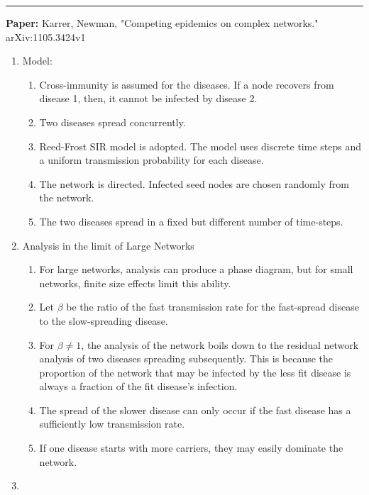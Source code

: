 \documentclass[11pt]{article}
\begin{document}
\noindent
\rule{\textwidth}{0.01in}
\textbf{Paper: } Karrer, Newman, "Competing epidemics on complex networks." arXiv:1105.3424v1
\begin{enumerate}
    
    \item Model: \begin{enumerate}
        \item Cross-immunity is assumed for the diseases. If a node 
        recovers from disease 1, then, it cannot be infected by disease 2.
        
        \item Two diseases spread concurrently.
        
        \item Reed-Frost SIR model is adopted. The model uses discrete time steps and a uniform transmission probability for each disease.
        
        \item The network is directed. Infected seed nodes
        are chosen randomly from the network. 
        
        \item The two diseases spread in a fixed but different
        number of time-steps.
    \end{enumerate}
    
    \item Analysis in the limit of Large Networks
    \begin{enumerate}
        
        \item For large networks, analysis can produce a phase diagram, but for small networks, finite size effects limit this ability.
        
        \item Let $\beta$ be the ratio of the fast transmission rate for the fast-spread disease to the slow-spreading disease.
        
        \item For $\beta \neq 1$, the analysis of the network boils down to the residual network analysis of two diseases spreading subsequently. This is because the proportion of the network that may be infected by the less fit disease is always a fraction of the fit disease's infection.
        
        \item The spread of the slower disease can only occur if the fast disease has a sufficiently low transmission rate.
        
        \item If one disease starts with more carriers, 
        they may easily dominate the network.
    \end{enumerate}
    \item  
    
\end{enumerate}
\end{document}
